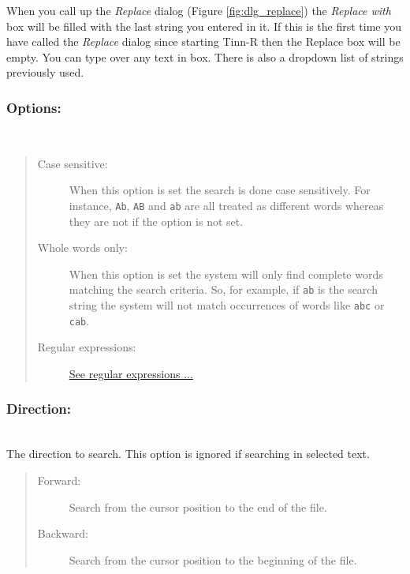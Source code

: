 When you call up the \textit{Replace} dialog
(Figure \ref{fig:dlg_replace})
the \textit{Replace with} box
will be filled with the last string you entered in it. If this is the first
time you have called the \textit{Replace} dialog since starting Tinn-R then
the Replace box will be empty. You can type over any text in box. There is
also a dropdown list of strings previously used.

\subsubsection{Options:}\\
\begin{quote}
  \begin{footnotesize}
    \begin{description}
      \item[Case sensitive:]
        When this option is set the search is done case sensitively. For instance,
        \texttt{Ab}, \texttt{AB} and \texttt{ab} are all treated as different words
        whereas they are not if the option is not set.
      \item[Whole words only:]
        When this option is set the system will only find complete words matching
        the search criteria. So, for example, if \texttt{ab} is the search string
        the system will not match occurrences of words like \texttt{abc} or
        \texttt{cab}.
      \item[Regular expressions:]
        \href{\#working\_regularexpressions}{See regular expressions ...}
    \end{description}
  \end{footnotesize}
\end{quote}


\subsubsection{Direction:}\\
The direction to search. This option is ignored if searching in selected text.

\begin{quote}
  \begin{footnotesize}
    \begin{description}
      \item[Forward:]
        Search from the cursor position to the end of the file.
      \item[Backward:]
        Search from the cursor position to the beginning of the file.
    \end{description}
  \end{footnotesize}
\end{quote}

